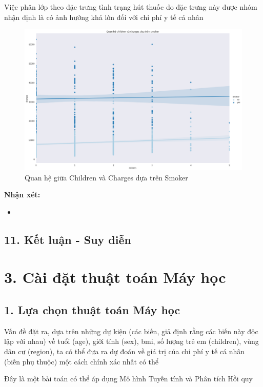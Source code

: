 \documentclass{article}
\begin{document}
	Việc phân lớp theo đặc trưng tình trạng hút thuốc do đặc trưng này được nhóm nhận định là có ảnh hưởng khá lớn đối với chi phí y tế cá nhân
	\begin{figure}[H]
		\centering
		\includegraphics[width=1\textwidth]{images/children_charges_by_smoker.png}
		\caption{Quan hệ giữa Children và Charges dựa trên Smoker}
		\label{fig:writing-thesis-linear-model-medical-charges-children-group-smoker}
	\end{figure}
	\textbf{Nhận xét:} 
	\begin{itemize}
		\item
	\end{itemize}

	\subsection{11. Kết luận - Suy diễn}
	
	\section{3. Cài đặt thuật toán Máy học}
	
	\subsection{1. Lựa chọn thuật toán Máy học}
	\qquad Vấn đề đặt ra, dựa trên những dự kiện (các biến, giả định rằng các biến này độc lập với nhau) về tuổi (age), giới tính (sex), bmi, số lượng trẻ em (children), vùng dân cư (region), ta có thể đưa ra dự đoán về giá trị của chi phí y tế cá nhân (biến phụ thuộc) một cách chính xác nhất có thể
	
	Đây là một bài toán có thể áp dụng Mô hình Tuyến tính và Phân tích Hồi quy
	
\end{document}
